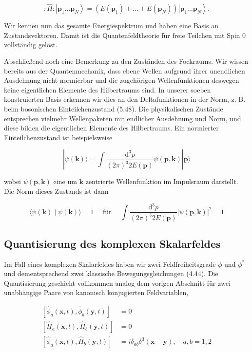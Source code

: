 \documentclass[10pt, letterpaper]{article}
\begin{document}
$$
: \hat{H}:\left|\mathbf{p}_{1} \ldots \mathbf{p}_{N}\right\rangle=\left(E\left(\mathbf{p}_{1}\right)+\ldots+E\left(\mathbf{p}_{N}\right)\right)\left|\mathbf{p}_{1} \ldots \mathbf{p}_{N}\right\rangle .
$$

Wir kennen nun das gesamte Energiespektrum und haben eine Basis an Zustandsvektoren. Damit ist die Quantenfeldtheorie für freie Teilchen mit Spin 0 vollständig gelöst.

Abschließend noch eine Bemerkung zu den Zuständen des Fockraums. Wir wissen bereits aus der Quantenmechanik, dass ebene Wellen aufgrund ihrer unendlichen Ausdehnung nicht normierbar und die zugehörigen Wellenfunktionen deswegen keine eigentlichen Elemente des Hilbertraums sind. In unserer soeben konstruierten Basis erkennen wir dies an den Deltafunktionen in der Norm, z. B. beim bosonischen Einteilchenzustand (5.48). Die physikalischen Zustände entsprechen vielmehr Wellenpaketen mit endlicher Ausdehnung und Norm, und diese bilden die eigentlichen Elemente des Hilbertraums. Ein normierter Einteilchenzustand ist beispielsweise

$$
|\psi(\mathbf{k})\rangle=\int \frac{\mathrm{d}^{3} p}{(2 \pi)^{3} 2 E(\mathbf{p})} \psi(\mathbf{p}, \mathbf{k})|\mathbf{p}\rangle
$$

wobei $\psi(\mathbf{p}, \mathbf{k})$ eine um $\mathbf{k}$ zentrierte Wellenfunktion im Impulsraum darstellt. Die Norm dieses Zustands ist dann

$$
\langle\psi(\mathbf{k}) \mid \psi(\mathbf{k})\rangle=1 \quad \text { für } \quad \int \frac{\mathrm{d}^{3} p}{(2 \pi)^{3} 2 E(\mathbf{p})}|\psi(\mathbf{p}, \mathbf{k})|^{2}=1
$$

\subsection*{Quantisierung des komplexen Skalarfeldes}
Im Fall eines komplexen Skalarfeldes haben wir zwei Feldfreiheitsgrade $\phi$ und $\phi^{*}$ und dementsprechend zwei klassische Bewegungsgleichungen (4.44). Die Quantisierung geschieht vollkommen analog dem vorigen Abschnitt für zwei unabhängige Paare von kanonisch konjugierten Feldvariablen,

$$
\begin{aligned}
{\left[\hat{\phi}_{a}(\mathbf{x}, t), \hat{\phi}_{b}(\mathbf{y}, t)\right] } & =0 \\
{\left[\hat{\Pi}_{a}(\mathbf{x}, t), \hat{\Pi}_{b}(\mathbf{y}, t)\right] } & =0 \\
{\left[\hat{\phi}_{a}(\mathbf{x}, t), \hat{\Pi}_{b}(\mathbf{y}, t)\right] } & =i \delta_{a b} \delta^{3}(\mathbf{x}-\mathbf{y}), \quad a, b=1,2
\end{aligned}
$$
\end{document}
